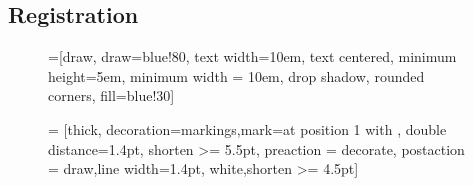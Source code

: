 \subsection{Registration} \label{subsec:registration}


\begin{figure}
\centering


=[draw, draw=blue!80, text width=10em, 
    text centered, minimum height=5em, minimum width = 10em, drop shadow, rounded corners,
    fill=blue!30]
    
 = [thick, decoration={markings,mark=at position
   1 with {}},
   double distance=1.4pt, shorten >= 5.5pt,
   preaction = {decorate},
   postaction = {draw,line width=1.4pt, white,shorten >= 4.5pt}]

\def\blockdist{1.5}
\def\edgedist{2.5}


\def\arrow{
  (10.75:1.1) -- (6.5:1) arc (6.25:120:1) [rounded corners=0.5] --
  (120:0.9) [rounded corners=1] -- (130:1.1) [rounded corners=0.5] --
  (120:1.3) [sharp corners] -- (120:1.2) arc (120:5.25:1.2)
  [rounded corners=1] -- (10.75:1.1) -- (6.5:1) -- cycle
}


\def\arrows[#1]{         
  \begin{scope}[scale=#1]
	\node[align=center] at (0,0) {\Huge{ Loop } \\ \Huge{ until matching } };  
  
    \draw[color=darkred, %
    drop shadow={ashadow, color=red!60!black}] \arrow;

    \draw[color=darkgreen, bottom color=green!60!black, top color=green!30, %
    drop shadow={ashadow, color=green!60!black}] [rotate=120] \arrow;

    \draw[color=darkblue, right color=blue!60, left color=blue!30, %
    drop shadow={ashadow, color=blue!60!black}] [rotate=240] \arrow;

    \draw[color=darkred, left color=red!60, right color=red!30] \arrow;
  \end{scope}
}


\end{figure}
